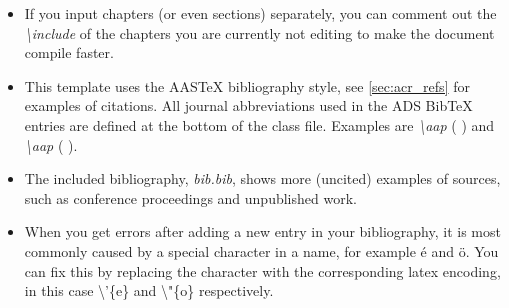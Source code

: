 \begin{itemize}
    \item If you input chapters (or even sections) separately, you can comment out the \textit{\textbackslash include} of the chapters you are currently not editing to make the document compile faster.
    \item This template uses the AASTeX bibliography style, see \cref{sec:acr_refs} for examples of citations. All journal abbreviations used in the ADS BibTeX entries are defined at the bottom of the class file. Examples are \textit{\textbackslash aap} ( \aap) and \textit{\textbackslash aap} ( \apj).
    \item The included bibliography, \textit{bib.bib}, shows more (uncited) examples of sources, such as conference proceedings and unpublished work.
    \item When you get errors after adding a new entry in your bibliography, it is most commonly caused by a special character in a name, for example é and ö. You can fix this by replacing the character with the corresponding latex encoding, in this case \textbackslash'\{e\} and \textbackslash"\{o\} respectively.
\end{itemize}

